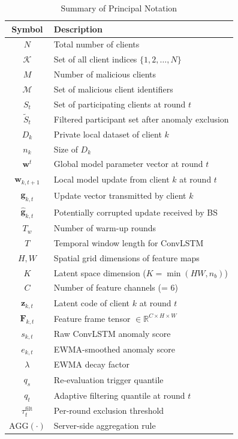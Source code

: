 \documentclass[journal]{IEEEtran}
\begin{document}
\begin{table}[t]
\centering
\caption{Summary of Principal Notation}
\label{tab:notation}
\begin{tabular}{@{}cl@{}}
\toprule
\textbf{Symbol} & \textbf{Description} \\
\midrule
$N$ & Total number of clients \\
$\mathcal{K}$ & Set of all client indices $\{1, 2, \ldots, N\}$ \\
$M$ & Number of malicious clients \\
$\mathcal{M}$ & Set of malicious client identifiers \\
$S_t$ & Set of participating clients at round $t$ \\
$\tilde{S}_t$ & Filtered participant set after anomaly exclusion \\
$D_k$ & Private local dataset of client $k$ \\
$n_k$ & Size of $D_k$ \\
$\mathbf{w}^t$ & Global model parameter vector at round $t$ \\
$\mathbf{w}_{k,t+1}$ & Local model update from client $k$ at round $t$ \\
$\mathbf{g}_{k,t}$ & Update vector transmitted by client $k$ \\
$\hat{\mathbf{g}}_{k,t}$ & Potentially corrupted update received by BS \\
$T_w$ & Number of warm-up rounds \\
$T$ & Temporal window length for ConvLSTM \\
$H, W$ & Spatial grid dimensions of feature maps \\
$K$ & Latent space dimension ($K = \min(HW, n_b)$) \\
$C$ & Number of feature channels (= 6) \\
$\mathbf{z}_{k,t}$ & Latent code of client $k$ at round $t$ \\
$\mathbf{F}_{k,t}$ & Feature frame tensor $\in \mathbb{R}^{C \times H \times W}$ \\
$s_{k,t}$ & Raw ConvLSTM anomaly score \\
$e_{k,t}$ & EWMA-smoothed anomaly score \\
$\lambda$ & EWMA decay factor \\
$q_s$ & Re-evaluation trigger quantile \\
$q_t$ & Adaptive filtering quantile at round $t$ \\
$\tau_t^{\text{filt}}$ & Per-round exclusion threshold \\
$\text{AGG}(\cdot)$ & Server-side aggregation rule \\
\bottomrule
\end{tabular}
\end{table}
\end{document}
